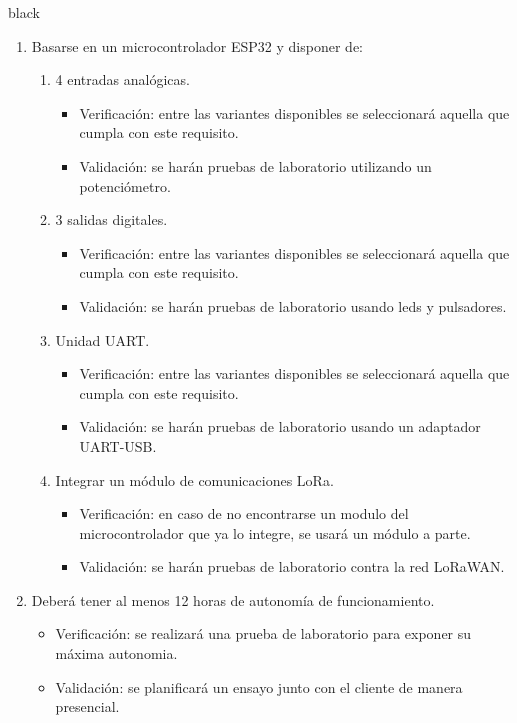 \documentclass[11pt]{charter}
\begin{document}
\begin{consigna}{black}
\begin{enumerate}
\begin{enumerate}[label*=\arabic*.]
			\item Basarse en un microcontrolador ESP32 y disponer de:
			\begin{enumerate}[label*=\arabic*.]
				\item 4 entradas analógicas.
					\begin{itemize}
							\item Verificación: entre las variantes disponibles se seleccionará aquella que cumpla con este requisito.\\
							\item Validación: se harán pruebas de laboratorio utilizando un potenciómetro.\\
					\end{itemize}
				\item 3 salidas digitales.
					\begin{itemize}
						\item Verificación: entre las variantes disponibles se seleccionará aquella que cumpla con este requisito.\\
						\item Validación: se harán pruebas de laboratorio usando leds y pulsadores.\\
					\end{itemize}
				\item Unidad UART.
					\begin{itemize}
						\item Verificación: entre las variantes disponibles se seleccionará aquella que cumpla con este requisito.\\
						\item Validación: se harán pruebas de laboratorio usando un adaptador UART-USB.\\
					\end{itemize}
				\item Integrar un módulo de comunicaciones LoRa.
					\begin{itemize}
						\item Verificación: en caso de no encontrarse un modulo del microcontrolador que ya lo integre, se usará un módulo a parte.\\
						\item Validación: se harán pruebas de laboratorio contra la red LoRaWAN.\\
					\end{itemize}
			\end{enumerate}
			
			\item Deberá tener al menos 12 horas de autonomía de funcionamiento.
				\begin{itemize}
					\item Verificación: se realizará una prueba de laboratorio para exponer su máxima autonomia.\\
					\item Validación: se planificará un ensayo junto con el cliente de manera presencial.\\
				\end{itemize}
			

\end{enumerate}
\end{enumerate}
\end{consigna}
\end{document}
